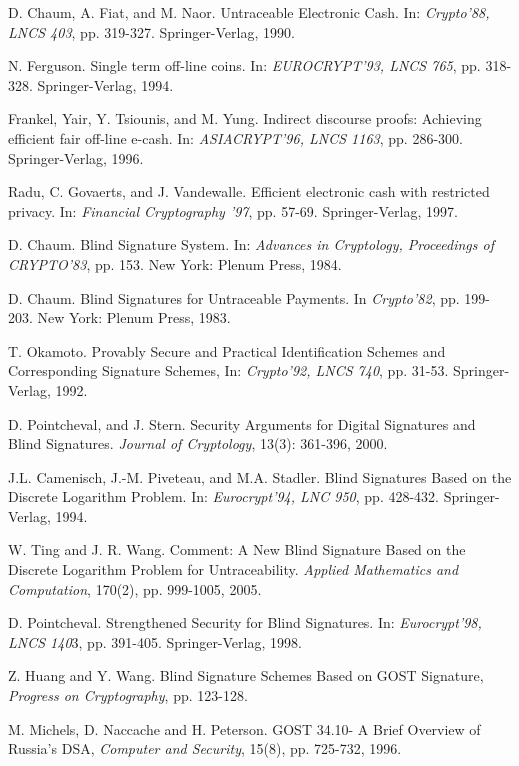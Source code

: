 \documentclass[journal,onecolumn,draftcls]{IEEEtran}
\begin{document}
\begin{thebibliography}{1}
 D. Chaum, A. Fiat, and M. Naor. Untraceable Electronic Cash. In: \textit{Crypto'88, LNCS 403}, pp. 319-327. Springer-Verlag, 1990.

 N. Ferguson. Single term off-line coins. In: \textit{EUROCRYPT’93, LNCS 765}, pp. 318-328. Springer-Verlag, 1994.

 Frankel, Yair, Y. Tsiounis, and M. Yung. Indirect discourse proofs: Achieving efficient fair off-line e-cash. In: \textit{ASIACRYPT’96, LNCS 1163}, pp. 286-300. Springer-Verlag, 1996.

 Radu, C. Govaerts, and J. Vandewalle. Efficient electronic cash with restricted privacy. In: \textit{Financial Cryptography ’97}, pp. 57-69. Springer-Verlag, 1997.

 D. Chaum. Blind Signature System. In: \textit{Advances in Cryptology, Proceedings of CRYPTO'83}, pp. 153. New York: Plenum Press, 1984.

 D. Chaum. Blind Signatures for Untraceable Payments. In \textit{Crypto'82}, pp. 199-203. New York: Plenum Press, 1983.

 T. Okamoto. Provably Secure and Practical Identification Schemes and Corresponding Signature Schemes, In: \textit{Crypto'92, LNCS 740}, pp. 31-53. Springer-Verlag, 1992.

 D. Pointcheval, and J. Stern. Security Arguments for Digital Signatures and Blind Signatures. \textit{Journal of Cryptology}, 13(3): 361-396, 2000.

 J.L. Camenisch, J.-M. Piveteau, and M.A. Stadler. Blind Signatures Based on the Discrete Logarithm Problem. In: \textit{Eurocrypt'94, LNC 950}, pp. 428-432. Springer-Verlag, 1994.

 W. Ting and J. R. Wang. Comment: A New Blind Signature Based on the Discrete Logarithm Problem for Untraceability. \textit{Applied Mathematics and Computation}, 170(2), pp. 999-1005, 2005.

 D. Pointcheval. Strengthened Security for Blind Signatures. In: \textit{Eurocrypt'98, LNCS 140}3, pp. 391-405. Springer-Verlag, 1998. 

 Z. Huang and Y. Wang. Blind Signature Schemes Based on GOST Signature, \textit{Progress on Cryptography}, pp. 123-128.

 M. Michels, D. Naccache and H. Peterson. GOST 34.10- A Brief Overview of Russia’s DSA, \textit{Computer and Security}, 15(8), pp. 725-732, 1996.


\end{thebibliography}
\end{document}
